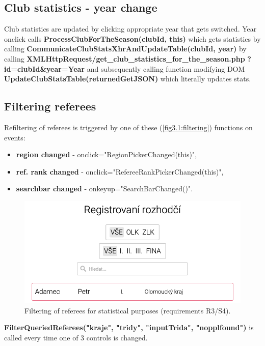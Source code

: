 \subsection{Club statistics - year change}
Club statistics are updated by clicking appropriate year that gets switched. Year onclick calls \textbf{ProcessClubForTheSeason(clubId, this)} which gets statistics by calling \textbf{CommunicateClubStatsXhrAndUpdateTable(clubId, year)}
\newline by calling \textbf{XMLHttpRequest/get\_club\_statistics\_for\_the\_season.php}
\newline \textbf{?id=clubId\&year=Year} and subsequently calling function modifying DOM 
\newline \textbf{UpdateClubStatsTable(returnedGetJSON)} which literally updates stats.

\subsection{Filtering referees}
Refiltering of referees is triggered by one of these (\autoref{fig3.1:filtering}) functions on events: 
\begin{itemize}
  \item \textbf{region changed} - onclick="RegionPickerChanged(this)", 
  \item \textbf{ref. rank changed} - onclick="RefereeRankPickerChanged(this)",
  \item \textbf{searchbar changed} - onkeyup="SearchBarChanged()".
\end{itemize}
\begin{figure}[h]	
	\centering
\includegraphics[scale=0.441]{img/filtering-preview.png}
\caption{Filtering of referees for statistical purposes (requirements R3/S4).}
\label{fig3.1:filtering}
\end{figure}
\textbf{FilterQueriedReferees("kraje", "tridy", "inputTrida", "nopplfound")} is called every time one of 3 controls is changed.
